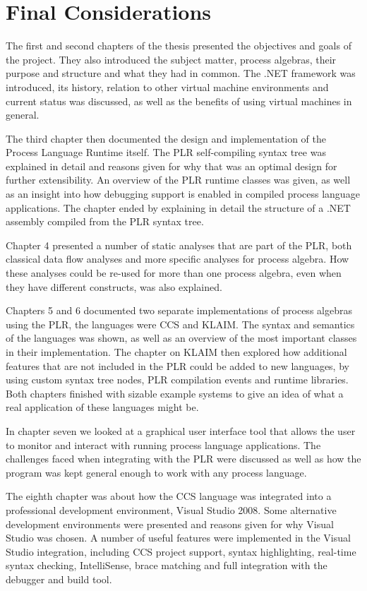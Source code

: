 \chapter{Final Considerations}

	The first and second chapters of the thesis presented the objectives and 
	goals of the project. They also introduced the subject matter, process 
	algebras, their purpose and structure and what they had in common. The .NET 
	framework was introduced, its history, relation to other virtual 
	machine environments and current status was discussed, as well as the 
	benefits of using virtual machines in general.
	
	The third chapter then documented the design and implementation of the 
	Process Language Runtime itself. The PLR self-compiling syntax tree was 
	explained in detail and reasons given for why that was an optimal design for 
	further extensibility. An overview of the PLR runtime classes was given, as 
	well as an insight into how debugging support is enabled in compiled process 
	language applications. The chapter ended by explaining in detail the 
	structure of a .NET assembly compiled from the PLR syntax tree.
	
	Chapter 4 presented a number of static analyses that are part of the PLR, 
	both classical data flow analyses and more specific analyses for process 
	algebra. How these analyses could be re-used for more than one process 
	algebra, even when they have different constructs, was also explained.
	
	Chapters 5 and 6 documented two separate implementations of process algebras 
	using the PLR, the languages were CCS and KLAIM. The syntax and semantics of 
	the languages was shown, as well as an overview of the most important 
	classes in their implementation. The chapter on KLAIM then explored how 
	additional features that are not included in the PLR could be added to new 
	languages, by using custom syntax tree nodes, PLR compilation events and 
	runtime libraries. Both chapters finished with sizable example systems to 
	give an idea of what a real application of these languages might be.
	
	In chapter seven we looked at a graphical user interface tool that allows
	the user to monitor and interact with running process language applications.
	The challenges faced when integrating with the PLR were discussed as well as
	how the program was kept general enough to work with any process language.
	
	The eighth chapter was about how the CCS language was integrated into a 
	professional development environment, Visual Studio 2008. Some alternative 
	development environments were presented and reasons given for why Visual 
	Studio was chosen. A number of useful features were implemented in the 
	Visual Studio integration, including CCS project support, syntax 
	highlighting, real-time syntax checking, IntelliSense, brace matching and 
	full integration with the debugger and build tool.
	
